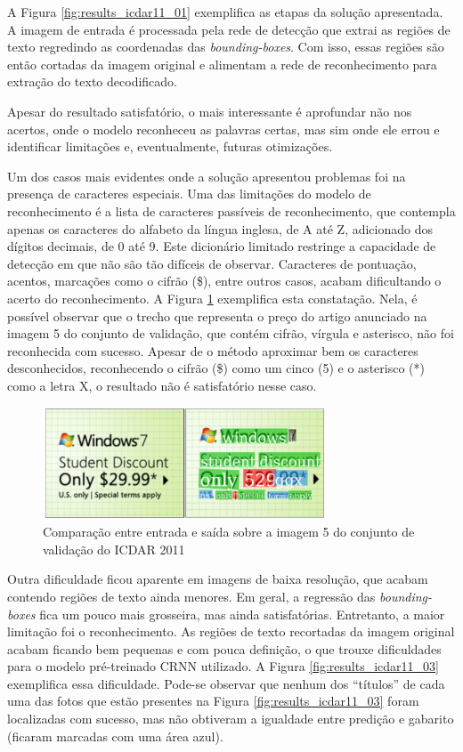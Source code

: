 A Figura \ref{fig:results_icdar11_01} exemplifica as etapas da solução apresentada. A imagem de entrada é processada pela rede de 
detecção que extrai as regiões de texto regredindo as coordenadas das \textit{bounding-boxes}. Com isso, essas regiões são então 
cortadas da imagem original e alimentam a rede de reconhecimento para extração do texto decodificado.

Apesar do resultado satisfatório, o mais interessante é aprofundar não nos acertos, onde o modelo reconheceu as palavras certas, 
mas sim onde ele errou e identificar limitações e, eventualmente, futuras otimizações.

Um dos casos mais evidentes onde a solução apresentou problemas foi na presença de caracteres especiais. Uma das limitações do 
modelo de reconhecimento é a lista de caracteres passíveis de reconhecimento, que contempla apenas os caracteres do alfabeto da 
língua inglesa, de A até Z, adicionado dos dígitos decimais, de 0 até 9. Este dicionário limitado restringe a capacidade 
de detecção em que não são tão difíceis de observar. Caracteres de pontuação, acentos, marcações como o cifrão (\$), entre 
outros casos, acabam dificultando o acerto do reconhecimento. A Figura \ref{fig:results_icdar11_02} exemplifica esta constatação. 
Nela, é possível observar que o trecho que representa o preço do artigo anunciado na imagem 5 do conjunto de validação, que 
contém cifrão, vírgula e asterisco, não foi reconhecida com sucesso. Apesar de o método aproximar bem os caracteres desconhecidos, 
reconhecendo o cifrão (\$) como um cinco (5) e o asterisco (*) como a letra X, o resultado não é satisfatório nesse caso.

\begin{figure}
    \centering
    \includegraphics[width=0.75\textwidth]{figs/resultados-icdar11-02.png}
    \caption{Comparação entre entrada e saída sobre a imagem 5 do conjunto de validação do ICDAR 2011}
    \label{fig:results_icdar11_02}
\end{figure}

Outra dificuldade ficou aparente em imagens de baixa resolução, que acabam contendo regiões de texto ainda menores. Em geral, 
a regressão das \textit{bounding-boxes} fica um pouco mais grosseira, mas ainda satisfatórias. Entretanto, a maior limitação 
foi o reconhecimento. As regiões de texto recortadas da imagem original acabam ficando bem pequenas e com pouca definição, o 
que trouxe dificuldades para o modelo pré-treinado CRNN utilizado. A Figura \ref{fig:results_icdar11_03} exemplifica essa 
dificuldade. Pode-se observar que nenhum dos “títulos” de cada uma das fotos que estão presentes na Figura \ref{fig:results_icdar11_03} 
foram localizadas com sucesso, mas não obtiveram a igualdade entre predição e gabarito (ficaram marcadas com uma área azul).

